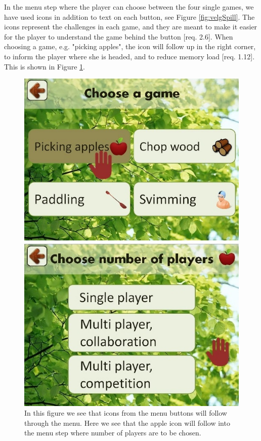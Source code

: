 In the menu step where the player can choose between the four single games, we have used icons in addition to text on each button, see Figure \ref{fig:velgSpill}. The icons represent the challenges in each game, and they are meant to make it easier for the player to understand the game behind the button [req. 2.6]. When choosing a game, e.g. "picking apples", the icon will follow up in the right corner, to inform the player where she is headed, and to reduce memory load [req. 1.12]. This is shown in Figure \ref{fig:iconEple}.  

\begin{figure} [H]
\centering
\includegraphics[scale=0.5]{menuIconApple.jpg}
\caption[Menu - use of icons]{In this figure we see that icons from the menu buttons will follow through the menu. Here we see that the apple icon will follow into the menu step where number of players are to be chosen.}
\label{fig:iconEple}
\end{figure} 

